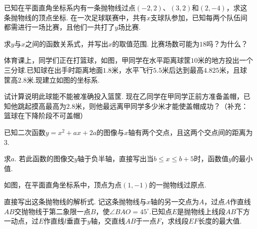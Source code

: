 \documentclass[10pt]{article}
\begin{document}
\begin{questions}{\answeringintroduction}
    \question 已知在平面直角坐标系内有一条抛物线过点$(-2,2)$、$(3,2)$和$(2,-4)$，求这条抛物线的顶点坐标.
    \addemptyline\addemptyline\addemptyline\addemptyline
    \question 在一次足球联赛中，共有$x$支球队参加，已知每两个队伍间都需进行一场比赛，且他们一共打了$y$场比赛.
    \begin{subquestions}
        \subquestion 求$y$与$x$之间的函数关系式，并写出$x$的取值范围.
        \subquestion 比赛场数可能为$18$吗？为什么？
    \end{subquestions}
    \addspace
    \question 体育课上，同学们正在打篮球，如图，甲同学在水平距离球筐$10$米的地方投出一个三分球.已知球在出手时距离地面$1.8$米，水平飞行$5.5$米后达到最高$4.825$米，且球筐高$2.8$米.现建立如图的坐标系.
    \begin{subquestions}
        \subquestion 试计算说明此球能不能被准确投入篮筐.
        \subquestion 现在乙同学在甲同学正前方准备盖帽，已知他跳起摸高最高为$2.8$米，则他最远离甲同学多少米才能使盖帽成功？（补充：篮球在下降阶段不可盖帽）
    \end{subquestions}
    \begin{figure}[!htb]
        \raggedleft
    \end{figure}
    \newpage
    \question 已知二次函数$y=x^2+ax+2a$的图像与$x$轴有两个交点，且这两个交点间的距离为$3$.
    \begin{subquestions}
        \subquestion 求$a$.
        \subquestion 若此函数的图像交$y$轴于负半轴，直接写出当$b \le x \le b+5$时，函数值$y$的最小值.
    \end{subquestions}
    \addspace
    \question 如图，在平面直角坐标系中，顶点为点$(1,-1)$的一抛物线过原点.
    \begin{subquestions}
        \subquestion 直接写出这条抛物线的解析式.
        \subquestion 记这条抛物线与$x$轴的另一交点为$A$，过点$A$作直线$AB$交抛物线于第二象限一点$B$，使$\angle BAO=45^{\circ}$.已知点$E$是抛物线上线段$AB$下方一动点，过$E$作直线$l$垂直于$y$轴，交直线$AB$于一点$F$，求线段$EF$长度的最大值.

\end{subquestions}
\end{questions}
\end{document}
